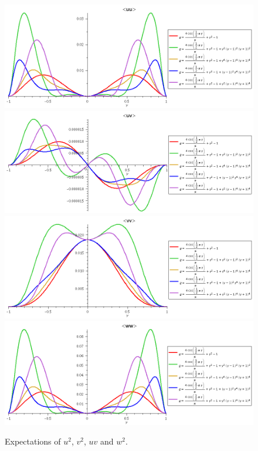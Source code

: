 \documentclass[10pt]{article}
\begin{document}
\begin{figure}[thb]
\centering
\includegraphics[scale=0.35]{uu.png}
\includegraphics[scale=0.35]{uv.png}
\includegraphics[scale=0.35]{vv.png}
\includegraphics[scale=0.35]{ww.png}
  \\[-0.2cm]
  \caption{Expectations of $u^2$, $v^2$, $uv$ and $w^2$.
           \label{fig:expectations}}
\end{figure}
\end{document}
